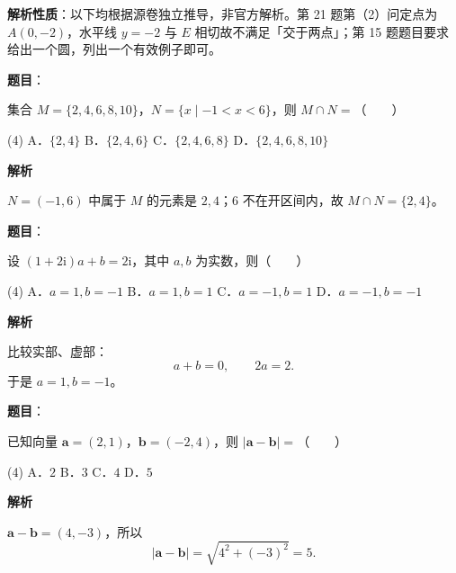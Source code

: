 

\begin{gktip}
\textbf{解析性质}：以下均根据源卷独立推导，非官方解析。第 21 题第（2）问定点为 $A(0,-2)$，水平线 $y=-2$ 与 $E$ 相切故不满足「交于两点」；第 15 题题目要求给出一个圆，列出一个有效例子即可。
\end{gktip}


\begin{answer}

\textbf{题目}：

集合 $M=\{2,4,6,8,10\}$，$N=\{x\mid-1<x<6\}$，则 $M\cap N=$\mbox{（　　）}

\begin{gkopts}(4)
\task A．$\{2,4\}$
\task B．$\{2,4,6\}$
\task C．$\{2,4,6,8\}$
\task D．$\{2,4,6,8,10\}$
\end{gkopts}

\textbf{解析}

$N=(-1,6)$ 中属于 $M$ 的元素是 $2,4$；$6$ 不在开区间内，故 $M\cap N=\{2,4\}$。


\end{answer}
\begin{answer}

\textbf{题目}：

设 $(1+2\mathrm i)a+b=2\mathrm i$，其中 $a,b$ 为实数，则\mbox{（　　）}

\begin{gkopts}(4)
\task A．$a=1,b=-1$
\task B．$a=1,b=1$
\task C．$a=-1,b=1$
\task D．$a=-1,b=-1$
\end{gkopts}

\textbf{解析}

比较实部、虚部：
\nopagebreak[4]
\[
a+b=0,\qquad 2a=2.
\]
于是 $a=1,b=-1$。


\end{answer}
\begin{answer}

\textbf{题目}：

已知向量 $\boldsymbol a=(2,1)$，$\boldsymbol b=(-2,4)$，则 $\lvert\boldsymbol a-\boldsymbol b\rvert=$\mbox{（　　）}

\begin{gkopts}(4)
\task A．$2$
\task B．$3$
\task C．$4$
\task D．$5$
\end{gkopts}

\textbf{解析}

$\boldsymbol a-\boldsymbol b=(4,-3)$，所以
\nopagebreak[4]
\[
\lvert\boldsymbol a-\boldsymbol b\rvert=\sqrt{4^2+(-3)^2}=5.
\]


\end{answer}
